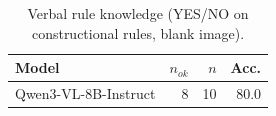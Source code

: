 \begin{table}[t]\centering\small
\caption{Verbal rule knowledge (YES/NO on constructional rules, blank image).}
\label{tab:know-rules}
\begin{tabular}{l r r r}\toprule Model & $n_{ok}$ & $n$ & Acc. \\ \midrule
Qwen3-VL-8B-Instruct & 8 & 10 & 80.0 \\
\bottomrule\end{tabular}\end{table}
